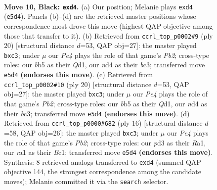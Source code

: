 \documentclass[11pt]{article}
\begin{document}
\begin{figure}[p]\centering
\begin{subfigure}{0.46\textwidth}\centering
\resizebox{\linewidth}{!}{%
\newchessgame
\chessboard[
  setfen={r1bq1rk1/pp3ppp/3b1n2/1B1pp3/3N4/2NP4/PPP2PPP/R1BQR1K1 b - - 0 10},
  showmover=false,
  pgfstyle=straightmove, color=movearrow, markmove={e5-d4}
]}
\caption{}
\end{subfigure}\hfill
\begin{subfigure}{0.46\textwidth}\centering
\resizebox{\linewidth}{!}{%
\newchessgame
\chessboard[
  setfen={r1bq1rk1/pp3ppp/2n2n2/2Pp4/8/P1bBPN2/1P3PPP/R1BQ1RK1 w - - 0 11},
  showmover=false,
  pgfstyle=straightmove, color=movearrow, markmove={b2-c3}
]}
\caption{}
\end{subfigure}
\\[4pt]
\begin{subfigure}{0.46\textwidth}\centering
\resizebox{\linewidth}{!}{%
\newchessgame
\chessboard[
  setfen={r1bq1rk1/pp3ppp/2n2n2/2Pp4/8/P1bBPN2/1P3PPP/R1BQ1RK1 w - - 0 11},
  showmover=false,
  pgfstyle=straightmove, color=movearrow, markmove={b2-c3}
]}
\caption{}
\end{subfigure}\hfill
\begin{subfigure}{0.46\textwidth}\centering
\resizebox{\linewidth}{!}{%
\newchessgame
\chessboard[
  setfen={r1bqk1nr/pp2pp1p/2np2p1/8/2P1P3/2bB1N2/PP3PPP/R1BQ1RK1 w kq - 0 9},
  showmover=false,
  pgfstyle=straightmove, color=movearrow, markmove={b2-c3}
]}
\caption{}
\end{subfigure}
\caption{\textbf{Move 10, Black: \texttt{exd4}.} (a) Our position; Melanie plays \texttt{exd4} (\texttt{e5d4}). Panels (b)--(d) are the retrieved master positions whose correspondence most drove this move (highest QAP objective among those that transfer to it). (b) Retrieved from \texttt{ccrl\_top\_p0002\#9} (ply 20) [structural distance $d$=53, QAP obj=27]: the master played \texttt{bxc3}; under $\mu$ our \emph{Pe4} plays the role of that game's \emph{Pb2}; cross-type roles: our \emph{b}b5 as their \emph{Q}d1, our \emph{n}d4 as their \emph{b}c3; transferred move \texttt{e5d4} \textbf{(endorses this move)}. (c) Retrieved from \texttt{ccrl\_top\_p0002\#10} (ply 20) [structural distance $d$=53, QAP obj=27]: the master played \texttt{bxc3}; under $\mu$ our \emph{Pe4} plays the role of that game's \emph{Pb2}; cross-type roles: our \emph{b}b5 as their \emph{Q}d1, our \emph{n}d4 as their \emph{b}c3; transferred move \texttt{e5d4} \textbf{(endorses this move)}. (d) Retrieved from \texttt{ccrl\_top\_p0000\#682} (ply 16) [structural distance $d$=58, QAP obj=26]: the master played \texttt{bxc3}; under $\mu$ our \emph{Pe4} plays the role of that game's \emph{Pb2}; cross-type roles: our \emph{p}d3 as their \emph{R}a1, our \emph{r}a1 as their \emph{B}c1; transferred move \texttt{e5d4} \textbf{(endorses this move)}. Synthesis: 8 retrieved analogs transferred to \texttt{exd4} (summed QAP objective 144, the strongest correspondence among the candidate moves); Melanie committed it via the \texttt{search} selector.}
\label{fig:thought-m19}
\end{figure}
\end{document}
